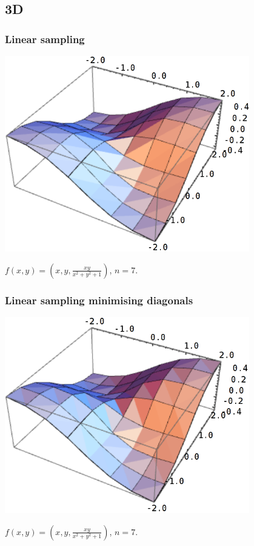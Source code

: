\documentclass{beamer}
\begin{document}
\subsection{3D}
\begin{frame}
\frametitle{Linear sampling}
\begin{center}
\includegraphics[width=0.8\textwidth]{3Dsimple.png}
\end{center}
$f(x,y) = \left(x,y, \frac{x y}{x^2 + y^2 + 1}\right)$, $n = 7$.
\end{frame}

\begin{frame}
\frametitle{Linear sampling minimising diagonals}
\begin{center}
\includegraphics[width=0.8\textwidth]{3Dlinear.png}
\end{center}
$f(x,y) = \left(x,y, \frac{x y}{x^2 + y^2 + 1}\right)$, $n = 7$.
\end{frame}
\end{document}

